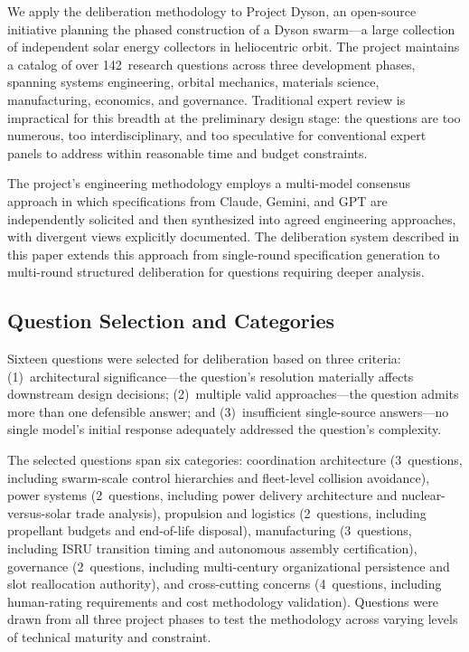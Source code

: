 \documentclass[11pt,a4paper]{article}
\begin{document}
We apply the deliberation methodology to Project Dyson, an open-source initiative planning the phased construction of a Dyson swarm---a large collection of independent solar energy collectors in heliocentric orbit. The project maintains a catalog of over 142~research questions across three development phases, spanning systems engineering, orbital mechanics, materials science, manufacturing, economics, and governance. Traditional expert review is impractical for this breadth at the preliminary design stage: the questions are too numerous, too interdisciplinary, and too speculative for conventional expert panels to address within reasonable time and budget constraints.

The project's engineering methodology employs a multi-model consensus approach in which specifications from Claude, Gemini, and GPT are independently solicited and then synthesized into agreed engineering approaches, with divergent views explicitly documented. The deliberation system described in this paper extends this approach from single-round specification generation to multi-round structured deliberation for questions requiring deeper analysis.

\subsection{Question Selection and Categories}

Sixteen questions were selected for deliberation based on three criteria: (1)~architectural significance---the question's resolution materially affects downstream design decisions; (2)~multiple valid approaches---the question admits more than one defensible answer; and (3)~insufficient single-source answers---no single model's initial response adequately addressed the question's complexity.

The selected questions span six categories: coordination architecture (3~questions, including swarm-scale control hierarchies and fleet-level collision avoidance), power systems (2~questions, including power delivery architecture and nuclear-versus-solar trade analysis), propulsion and logistics (2~questions, including propellant budgets and end-of-life disposal), manufacturing (3~questions, including ISRU transition timing and autonomous assembly certification), governance (2~questions, including multi-century organizational persistence and slot reallocation authority), and cross-cutting concerns (4~questions, including human-rating requirements and cost methodology validation). Questions were drawn from all three project phases to test the methodology across varying levels of technical maturity and constraint.
\end{document}

